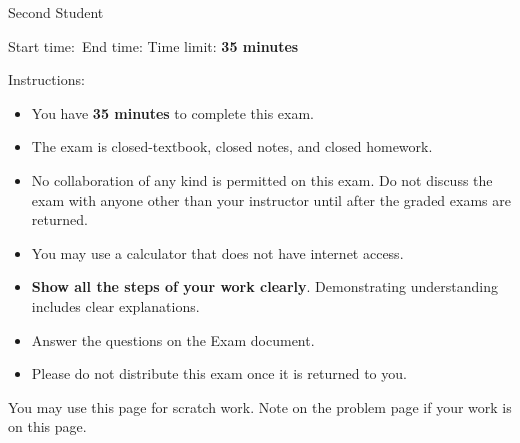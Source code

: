 \documentclass[main.tex,14pt]{subfiles}
\begin{document}
\setcounter{page}{0}
\thispagestyle{empty}

{\Large Second Student}%

{Start time:\hrulefill\ End time: \hrulefill}
Time limit: \textbf{35 minutes}
\ifprintanswers
\else %

\vspace{1cm}
{\Large Instructions:}
\begin{itemize}

 \item You have \textbf{35 minutes} to complete this exam.

 \item The exam is closed-textbook, closed notes, and closed homework. 
 
 \item No collaboration of any kind is permitted on this exam. Do not discuss the exam with anyone other than your instructor until after the graded exams are returned.
 
 \item You may use a calculator that does not have internet access. 

 \item \textbf{Show all the steps of your work clearly}. Demonstrating understanding includes clear explanations.
 
\item Answer the questions on the Exam document. 


\item Please do not distribute this exam once it is returned to you.



 \end{itemize}


\afterpage{\blankpage}

\clearpage
\fi


\ifprintanswers
\else %

You may use this page for scratch work. Note on the problem page if your work is on this page.
\thispagestyle{empty}
\hbox{}


\checkoddpage{}
\fi
\end{document}
